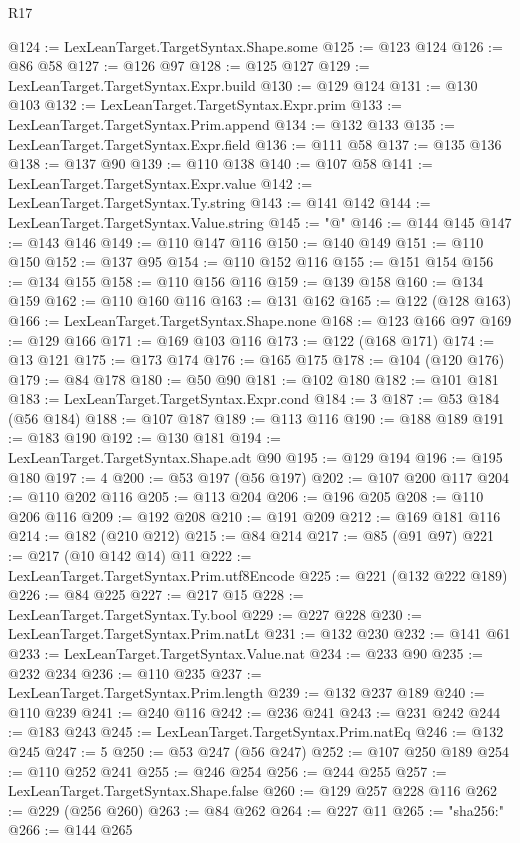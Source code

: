 \begin{lexlean}{R17}
\begin{coremodule}
{{{{{{{{{{{{{{{{{{{{{{{{{{{{{{{{{{{{{{{{{{{{{{{{{{{{{{{{{{{{{{{{{{{{{{{{{{{{{{{{{{{{{@124 := LexLeanTarget.TargetSyntax.Shape.some
@125 := @123 @124
@126 := @86 @58
@127 := @126 @97
@128 := @125 @127
@129 := LexLeanTarget.TargetSyntax.Expr.build
@130 := @129 @124
@131 := @130 @103
@132 := LexLeanTarget.TargetSyntax.Expr.prim
@133 := LexLeanTarget.TargetSyntax.Prim.append
@134 := @132 @133
@135 := LexLeanTarget.TargetSyntax.Expr.field
@136 := @111 @58
@137 := @135 @136
@138 := @137 @90
@139 := @110 @138
@140 := @107 @58
@141 := LexLeanTarget.TargetSyntax.Expr.value
@142 := LexLeanTarget.TargetSyntax.Ty.string
@143 := @141 @142
@144 := LexLeanTarget.TargetSyntax.Value.string
@145 := "@"
@146 := @144 @145
@147 := @143 @146
@149 := @110 @147 @116
@150 := @140 @149
@151 := @110 @150
@152 := @137 @95
@154 := @110 @152 @116
@155 := @151 @154
@156 := @134 @155
@158 := @110 @156 @116
@159 := @139 @158
@160 := @134 @159
@162 := @110 @160 @116
@163 := @131 @162
@165 := @122 (@128 @163)
@166 := LexLeanTarget.TargetSyntax.Shape.none
@168 := @123 @166 @97
@169 := @129 @166
@171 := @169 @103 @116
@173 := @122 (@168 @171)
@174 := @13 @121
@175 := @173 @174
@176 := @165 @175
@178 := @104 (@120 @176)
@179 := @84 @178
@180 := @50 @90
@181 := @102 @180
@182 := @101 @181
@183 := LexLeanTarget.TargetSyntax.Expr.cond
@184 := 3
@187 := @53 @184 (@56 @184)
@188 := @107 @187
@189 := @113 @116
@190 := @188 @189
@191 := @183 @190
@192 := @130 @181
@194 := LexLeanTarget.TargetSyntax.Shape.adt @90
@195 := @129 @194
@196 := @195 @180
@197 := 4
@200 := @53 @197 (@56 @197)
@202 := @107 @200 @117
@204 := @110 @202 @116
@205 := @113 @204
@206 := @196 @205
@208 := @110 @206 @116
@209 := @192 @208
@210 := @191 @209
@212 := @169 @181 @116
@214 := @182 (@210 @212)
@215 := @84 @214
@217 := @85 (@91 @97)
@221 := @217 (@10 @142 @14) @11
@222 := LexLeanTarget.TargetSyntax.Prim.utf8Encode
@225 := @221 (@132 @222 @189)
@226 := @84 @225
@227 := @217 @15
@228 := LexLeanTarget.TargetSyntax.Ty.bool
@229 := @227 @228
@230 := LexLeanTarget.TargetSyntax.Prim.natLt
@231 := @132 @230
@232 := @141 @61
@233 := LexLeanTarget.TargetSyntax.Value.nat
@234 := @233 @90
@235 := @232 @234
@236 := @110 @235
@237 := LexLeanTarget.TargetSyntax.Prim.length
@239 := @132 @237 @189
@240 := @110 @239
@241 := @240 @116
@242 := @236 @241
@243 := @231 @242
@244 := @183 @243
@245 := LexLeanTarget.TargetSyntax.Prim.natEq
@246 := @132 @245
@247 := 5
@250 := @53 @247 (@56 @247)
@252 := @107 @250 @189
@254 := @110 @252 @241
@255 := @246 @254
@256 := @244 @255
@257 := LexLeanTarget.TargetSyntax.Shape.false
@260 := @129 @257 @228 @116
@262 := @229 (@256 @260)
@263 := @84 @262
@264 := @227 @11
@265 := "sha256:"
@266 := @144 @265
}}}}}}}}}}}}}}}}}}}}}}}}}}}}}}}}}}}}}}}}}}}}}}}}}}}}}}}}}}}}}}}}}}}}}}}}}}}}}}}}}}}}}
\end{coremodule}
\end{lexlean}
